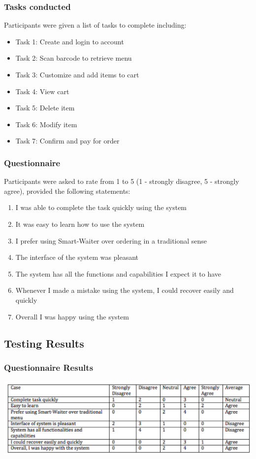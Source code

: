 \documentclass[12pt, titlepage]{article}
\begin{document}
\subsubsection{Tasks conducted}
Participants were given a list of tasks to complete including: 
\begin{itemize}  
\item Task 1: Create and login to account
\item Task 2: Scan barcode to retrieve menu
\item Task 3: Customize and add items to cart
\item Task 4: View cart
\item Task 5: Delete item
\item Task 6: Modify item
\item Task 7: Confirm and pay for order
\end{itemize}
\subsubsection{Questionnaire}
Participants were asked to rate from 1 to 5 (1 - strongly disagree, 5 - strongly agree), provided the following statements: 
\begin{enumerate}
\item  I was able to complete the task quickly using the system
\item It was easy to learn how to use the system
\item I prefer using Smart-Waiter over ordering in a traditional sense
\item The interface of the system was pleasant
\item The system has all the functions and capabilities I expect it to have
\item Whenever I made a mistake using the system, I could recover easily and quickly
\item Overall I was happy using the system
\end{enumerate} 

\subsection{Testing Results} 

\subsubsection{Questionnaire Results}

\includegraphics[width=1.2\textwidth]{usabilityResults.png}
\end{document}
